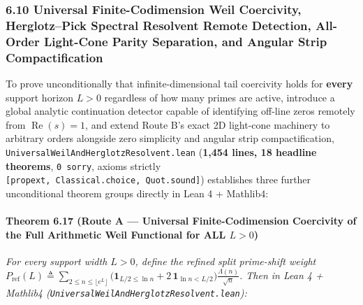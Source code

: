 \documentclass[
  11pt,
]{article}
\begin{document}
\subsubsection{6.10 Universal Finite-Codimension Weil Coercivity,
Herglotz--Pick Spectral Resolvent Remote Detection, All-Order Light-Cone
Parity Separation, and Angular Strip
Compactification}\label{universal-finite-codimension-weil-coercivity-herglotzpick-spectral-resolvent-remote-detection-all-order-light-cone-parity-separation-and-angular-strip-compactification}

To prove unconditionally that infinite-dimensional tail coercivity holds
for \textbf{every} support horizon \(L > 0\) regardless of how many
primes are active, introduce a global analytic continuation detector
capable of identifying off-line zeros remotely from
\(\operatorname{Re}(s) = 1\), and extend Route B's exact 2D light-cone
machinery to arbitrary orders alongside zero simplicity and angular
strip compactification, \texttt{UniversalWeilAndHerglotzResolvent.lean}
(\textbf{1,454 lines, 18 headline theorems}, \texttt{0\ sorry}, axioms
strictly \texttt{{[}propext,\ Classical.choice,\ Quot.sound{]}})
establishes three further unconditional theorem groups directly in Lean
4 + Mathlib4:

\paragraph{\texorpdfstring{Theorem 6.17 (Route A --- Universal
Finite-Codimension Coercivity of the Full Arithmetic Weil Functional for
ALL
\(L > 0\))}{Theorem 6.17 (Route A --- Universal Finite-Codimension Coercivity of the Full Arithmetic Weil Functional for ALL L \textgreater{} 0)}}\label{theorem-6.17-route-a-universal-finite-codimension-coercivity-of-the-full-arithmetic-weil-functional-for-all-l-0}

\emph{For every support width \(L > 0\), define the refined split
prime-shift weight
\(P_{\text{ref}}(L) \triangleq \sum_{2 \le n \le \lfloor e^L \rfloor} \big(\mathbf{1}_{L/2 \le \ln n} + 2\,\mathbf{1}_{\ln n < L/2}\big)\frac{\Lambda(n)}{\sqrt{n}}\).
Then in Lean 4 + Mathlib4
(\texttt{UniversalWeilAndHerglotzResolvent.lean}):}
\end{document}
